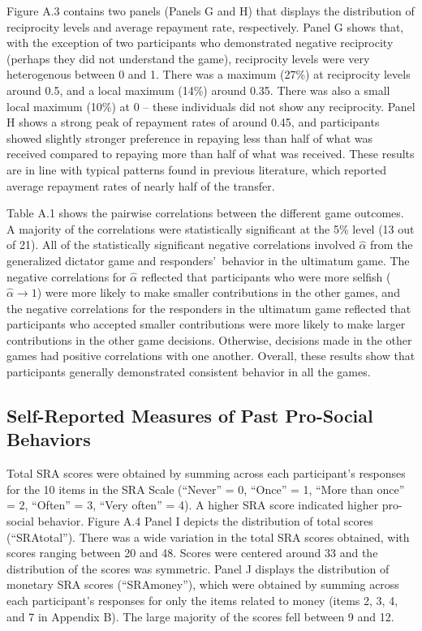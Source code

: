\documentclass[12pt]{article}
\begin{document}
Figure A.3 contains two panels (Panels G and H) that displays the distribution of reciprocity levels and average repayment rate, respectively. Panel G shows that, with the exception of two participants who demonstrated negative reciprocity (perhaps they did not understand the game), reciprocity levels were very heterogenous between 0 and 1. There was a maximum (27\%) at reciprocity levels around 0.5, and a local maximum (14\%) around 0.35. There was also a small local maximum (10\%) at 0 -- these individuals did not show any reciprocity. Panel H shows a strong peak of repayment rates of around 0.45, and participants showed slightly stronger preference in repaying less than half of what was received compared to repaying more than half of what was received. These results are in line with typical patterns found in previous literature, which reported average repayment rates of nearly half of the transfer.

Table A.1 shows the pairwise correlations between the different game outcomes. A majority of the correlations were statistically significant at the 5\% level (13 out of 21). All of the statistically significant negative correlations involved \(\hat{\alpha}\) from the generalized dictator game and responders\rq \ behavior in the ultimatum game. The negative correlations for \(\hat{\alpha}\) reflected that participants who were more selfish (\(\hat{\alpha} \rightarrow 1\)) were more likely to make smaller contributions in the other games, and the negative correlations for the responders in the ultimatum game reflected that participants who accepted smaller contributions were more likely to make larger contributions in the other game decisions. Otherwise, decisions made in the other games had positive correlations with one another. Overall, these results show that participants generally demonstrated consistent behavior in all the games.

\subsection{Self-Reported Measures of Past Pro-Social Behaviors}

Total SRA scores were obtained by summing across each participant\rq s responses for the 10 items in the SRA Scale (``Never'' = 0, ``Once'' = 1, ``More than once'' = 2, ``Often'' = 3, ``Very often'' = 4). A higher SRA score indicated higher pro-social behavior. Figure A.4 Panel I depicts the distribution of total scores (``SRAtotal''). There was a wide variation in the total SRA scores obtained, with scores ranging between 20 and 48. Scores were centered around 33 and the distribution of the scores was symmetric. Panel J displays the distribution of monetary SRA scores (``SRAmoney''), which were obtained by summing across each participant\rq s responses for only the items related to money (items 2, 3, 4, and 7 in Appendix B).  The large majority of the scores fell between 9 and 12.
\end{document}
